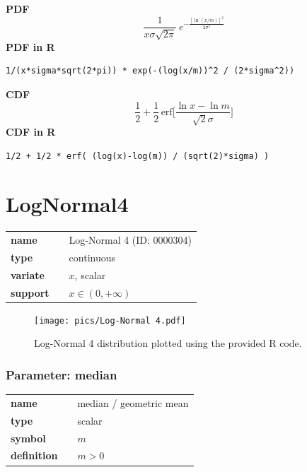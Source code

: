 \documentclass{article}
\begin{document}
\smallskip \noindent \hspace{.2cm} \textbf{PDF} 
\begin{equation*}\frac{1}{x\sigma\sqrt{2\pi}}\ e^{-\frac{\left[\ln (x/m)\right]^2}{2\sigma^2}}\end{equation*}
\smallskip \noindent \hspace{.2cm} \textbf{PDF in R}  
\begin{verbatim}1/(x*sigma*sqrt(2*pi)) * exp(-(log(x/m))^2 / (2*sigma^2))\end{verbatim}
\smallskip \noindent \hspace{.2cm} \textbf{CDF} 
\begin{equation*}\frac12 + \frac12\,\text{erf}\Big[\frac{\ln x-\ln m}{\sqrt{2}\sigma}\Big]\end{equation*}
\smallskip \noindent \hspace{.2cm} \textbf{CDF in R} 
\begin{verbatim}1/2 + 1/2 * erf( (log(x)-log(m)) / (sqrt(2)*sigma) )\end{verbatim}
\smallskip\section*{LogNormal4} 

  \bigskip 

\begin{tabular}{p{2cm}cl}
\textbf{name} & & Log-Normal 4 (ID: 0000304)\\ 
 
\textbf{type} & & continuous \\ 

\textbf{variate} & & $x$, scalar \\ 

\textbf{support} & & $x \in (0,+\infty)$
\end{tabular}

\begin{figure}[ht!]
\centering
  \texttt{[image: pics/Log-Normal 4.pdf]}
 \caption{Log-Normal 4 distribution plotted using the provided R code.}
 \label{fig:Log-Normal 4}
\end{figure}

\subsubsection*{Parameter: median}

\noindent\begin{tabular}{p{2cm}cl}
\textbf{name} & & median / geometric mean \\
\textbf{type} & & scalar \\
\textbf{symbol} & & $m$  \\
\textbf{definition} & & $m>0$
\end{tabular}
\end{document}
